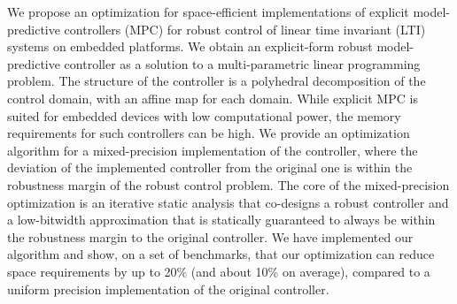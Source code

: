 We propose an optimization for space-efficient implementations of explicit model-predictive controllers (MPC)
for robust control of linear time invariant (LTI) systems on embedded platforms. 
We obtain an explicit-form robust model-predictive controller as a solution to a multi-parametric 
linear programming problem.
The structure of the controller is a polyhedral decomposition of the control domain,
with an affine map for each domain.
While explicit MPC is suited for embedded devices with low computational power, the memory requirements
for such controllers can be high.
We provide an optimization algorithm for a mixed-precision implementation of the controller,
where the deviation of the implemented controller from the original one is within the robustness
margin of the robust control problem.
The core of the mixed-precision optimization is an iterative static analysis that co-designs
a robust controller and a low-bitwidth approximation 
that is statically guaranteed to always be within the robustness margin to the original controller.
We have implemented our algorithm and show, on a set of benchmarks, that our optimization
can reduce space requirements by up to 20\% (and about 10\% on average), compared to a uniform precision
implementation of the original controller.

